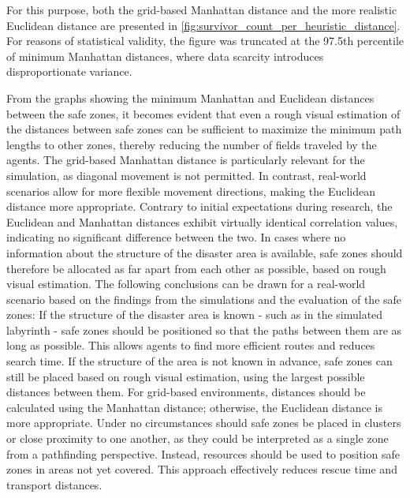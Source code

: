 \documentclass[3p,times,procedia]{elsarticle}
\begin{document}
For this purpose, both the grid-based Manhattan distance and the more realistic Euclidean distance are presented in \autoref{fig:survivor_count_per_heuristic_distance}. For reasons of statistical validity, the figure was truncated at the 97.5th percentile of minimum Manhattan distances, where data scarcity introduces disproportionate variance.


From the graphs showing the minimum Manhattan and Euclidean distances between the safe zones, it becomes evident that even a rough visual estimation of the distances between safe zones can be sufficient to maximize the minimum path lengths to other zones, thereby reducing the number of fields traveled by the agents.
The grid-based Manhattan distance is particularly relevant for the simulation, as diagonal movement is not permitted. 
In contrast, real-world scenarios allow for more flexible movement directions, making the Euclidean distance more appropriate. Contrary to initial expectations during research, the Euclidean and Manhattan distances exhibit virtually identical correlation values, indicating no significant difference between the two.
In cases where no information about the structure of the disaster area is available, safe zones should therefore be allocated as far apart from each other as possible, based on rough visual estimation. 
The following conclusions can be drawn for a real-world scenario based on the findings from the simulations and the evaluation of the safe zones: If the structure of the disaster area is known - such as in the simulated labyrinth  - safe zones should be positioned so that the paths between them are as long as possible. 
This allows agents to find more efficient routes and reduces search time. If the structure of the area is not known in advance, safe zones can still be placed based on rough visual estimation, using the largest possible distances between them. 
For grid-based environments, distances should be calculated using the Manhattan distance; otherwise, the Euclidean distance is more appropriate. Under no circumstances should safe zones be placed in clusters or close proximity to one another, as they could be interpreted as a single zone from a pathfinding perspective. Instead, resources should be used to position safe zones in areas not yet covered.  This approach effectively reduces rescue time and transport distances.
\end{document}
